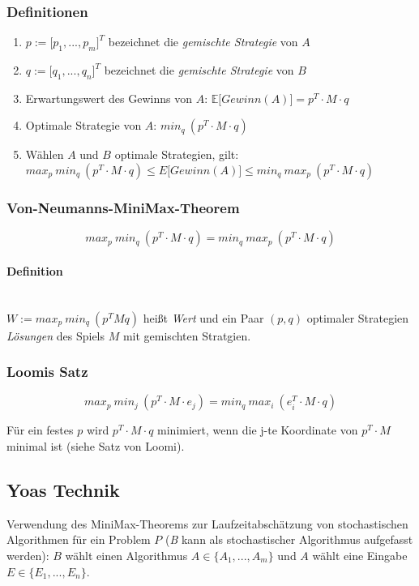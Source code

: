 \subsubsection{Definitionen}
\begin{enumerate}
	\item \(p := \lbrack p_1,...,p_m \rbrack^T \) bezeichnet die \textit{gemischte Strategie} von \(A\)
	\item \(q := \lbrack q_1,...,q_n \rbrack^T \) bezeichnet die \textit{gemischte Strategie} von \(B\)
	\item Erwartungswert des Gewinns von \(A\): \(\mathbb{E}\lbrack Gewinn(A) \rbrack = p^T \cdot M \cdot q\)
	\item Optimale Strategie von \(A\): \(min_q~(p^T \cdot M \cdot q)\)
	\item Wählen \(A\) und \(B\) optimale Strategien, gilt:\\ \(max_p~min_q~(p^T \cdot M \cdot q) \leq E \lbrack Gewinn(A) \rbrack \leq min_q~max_p~(p^T \cdot M \cdot q)\)
\end{enumerate}

\subsubsection{Von-Neumanns-MiniMax-Theorem}
\[max_p~min_q~(p^T \cdot M \cdot q) = min_q~max_p~(p^T \cdot M \cdot q)\]

\paragraph{Definition}
\text{}\\ \(W := max_p~min_q~(p^TMq)\) heißt \textit{Wert} und ein Paar \((p,q)\) optimaler Strategien \textit{Lösungen} des Spiels \(M\) mit gemischten Stratgien.

\subsubsection{Loomis Satz}
\[max_p~min_j~(p^T \cdot M \cdot e_j) = min_q~max_i~(e_i^T \cdot M \cdot q)\]

Für ein festes \(p\) wird \(p^T \cdot M \cdot q\) minimiert, wenn die j-te Koordinate von \(p^T \cdot M\) minimal ist (siehe Satz von Loomi).


\subsection{Yoas Technik}
Verwendung des MiniMax-Theorems zur Laufzeitabschätzung von stochastischen Algorithmen für ein Problem \(P\) (\textit{B} kann als stochastischer Algorithmus aufgefasst werden):
\(B\) wählt einen Algorithmus \(A \in \{A_1,...,A_m\}\) und \(A\) wählt eine Eingabe \(E \in \{E_1,...,E_n\}\).

